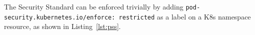\documentclass[english, 12pt, a4paper, sci, utf8, a-2b, online]{aaltothesis}
\begin{document}


The Security Standard can be enforced trivially by adding \texttt{pod-security.kubernetes.io/enforce: restricted} as a label on a K8s namespace resource, as shown in Listing~\ref{lst:pss}.



\end{document}
